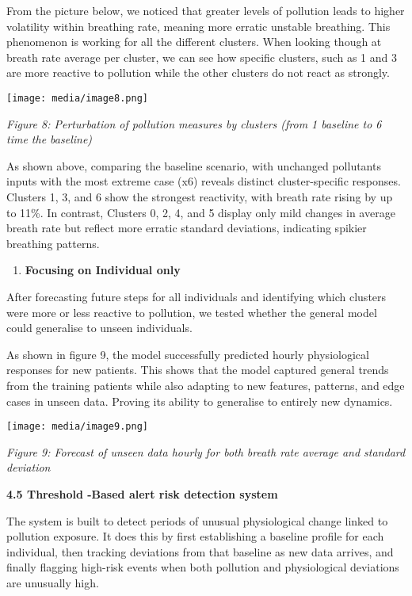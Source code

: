 \documentclass[
]{article}
\begin{document}
From the picture below, we noticed that greater levels of pollution
leads to higher volatility within breathing rate, meaning more erratic
unstable breathing. This phenomenon is working for all the different
clusters. When looking though at breath rate average per cluster, we can
see how specific clusters, such as 1 and 3 are more reactive to
pollution while the other clusters do not react as strongly.

\texttt{[image: media/image8.png]}

\emph{Figure 8: Perturbation of pollution measures by clusters (from 1
baseline to 6 time the baseline)}

As shown above, comparing the baseline scenario, with unchanged
pollutants inputs with the most extreme case (x6) reveals distinct
cluster-specific responses. Clusters 1, 3, and 6 show the strongest
reactivity, with breath rate rising by up to 11\%. In contrast, Clusters
0, 2, 4, and 5 display only mild changes in average breath rate but
reflect more erratic standard deviations, indicating spikier breathing
patterns.

\begin{enumerate}
\def\labelenumi{\arabic{enumi}.}
\setcounter{enumi}{3}
\item
  \textbf{Focusing on Individual only}
\end{enumerate}

After forecasting future steps for all individuals and identifying which
clusters were more or less reactive to pollution, we tested whether the
general model could generalise to unseen individuals.

As shown in figure 9, the model successfully predicted hourly
physiological responses for new patients. This shows that the model
captured general trends from the training patients while also adapting
to new features, patterns, and edge cases in unseen data. Proving its
ability to generalise to entirely new dynamics.

\texttt{[image: media/image9.png]}

\emph{Figure 9: Forecast of unseen data hourly for both breath rate
average and standard deviation}

\textbf{4.5 Threshold -Based alert risk detection system}

The system is built to detect periods of unusual physiological change
linked to pollution exposure. It does this by first establishing a
baseline profile for each individual, then tracking deviations from that
baseline as new data arrives, and finally flagging high-risk events when
both pollution and physiological deviations are unusually high.
\end{document}
